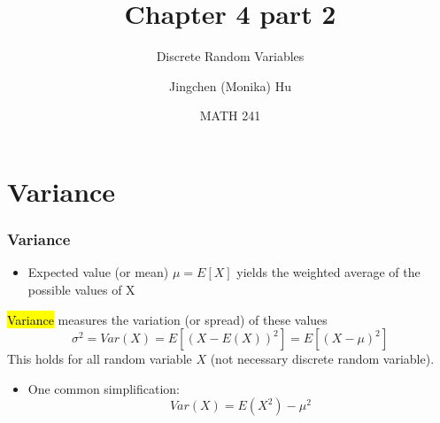 \documentclass[slidestop,compress,mathserif]{beamer}
\title[Chapter 4 part 2]{Chapter 4 part 2}
\subtitle{Discrete Random Variables}
\author[Jingchen (Monika) Hu] %
{Jingchen (Monika) Hu}
\institute[Vassar] %
{Vassar College}
\date[MATH 241] %
{MATH 241}
\begin{document}


\begin{frame}%
\titlepage
\end{frame}

%
%
%
%
%
%



\section{Variance}

\begin{frame}\frametitle{Variance}

\begin{itemize}
\item Expected value (or mean) $\mu = E[X]$ yields the weighted average of the possible values of X
\end{itemize}

\pause
\begin{defn}
\hl{Variance} measures the variation (or spread) of these values
\[\sigma^2 = Var(X) = E\left[ (X-E(X))^2\right] = E\left[(X-\mu)^2 \right] \]
This holds for all random variable $X$ (not necessary discrete random variable).
\end{defn}

\pause
\begin{itemize}
\item One common simplification:
\[
Var(X) 	  =  E(X^2)-\mu^2
\]
\end{itemize}


\end{frame}
\end{document}
